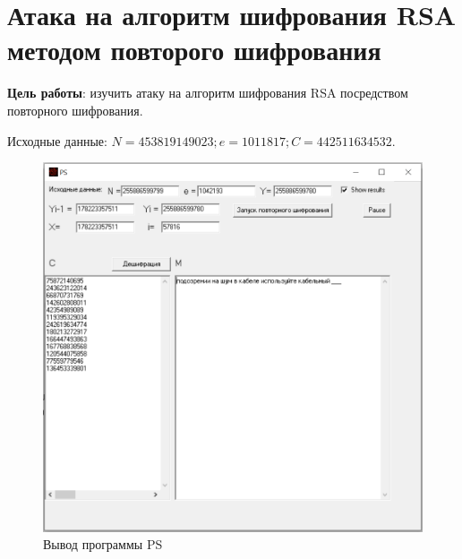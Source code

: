 \section{Атака на алгоритм шифрования RSA методом повторого шифрования}

\textbf{Цель работы}: изучить атаку на алгоритм шифрования RSA посредством повторного шифрования.

Исходные данные: $N = 453819149023; e = 1011817; C = 442511634532$.

\begin{figure}[H]
	\centering
	\includegraphics[width=0.7\linewidth]{img/2}
	\caption{Вывод программы PS}
\end{figure}
